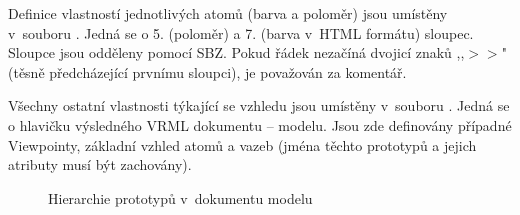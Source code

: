 Definice vlastností jednotlivých atomů (barva a poloměr) jsou umístěny v~souboru
. Jedná se o 5. (poloměr) a 7. (barva v~HTML formátu) sloupec.
Sloupce jsou odděleny pomocí SBZ. Pokud řádek nezačíná dvojicí znaků ,,$>>$"
(těsně předcházející prvnímu sloupci), je považován za komentář.

Všechny ostatní vlastnosti týkající se vzhledu jsou umístěny v~souboru
. Jedná se o hlavičku výsledného VRML dokumentu -- modelu.
Jsou zde definovány případné Viewpointy, základní vzhled atomů a vazeb (jména
těchto prototypů a jejich atributy musí být zachovány).

\begin{figure}[h]
	\caption{Hierarchie prototypů v~dokumentu modelu}
\end{figure}


